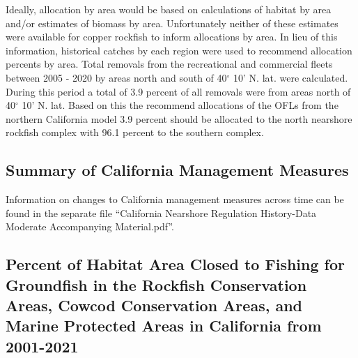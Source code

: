\documentclass[11pt,
  english,
  a4paper,
]{article}
\begin{document}
\leavevmode\tagmcend\tagstructend\par


Ideally, allocation by area would be based on calculations of habitat by area and/or estimates of biomass by area. Unfortunately neither of these estimates were available for copper rockfish to inform allocations by area. In lieu of this information, historical catches by each region were used to recommend allocation percents by area. Total removals from the recreational and commercial fleets between 2005 - 2020 by areas north and south of 40{\(^\circ\)\leavevmode\tagmcend\tagstructend} 10' N. lat. were calculated. During this period a total of 3.9 percent of all removals were from areas north of 40{\(^\circ\)\leavevmode\tagmcend\tagstructend} 10' N. lat. Based on this the recommend allocations of the OFLs from the northern California model 3.9 percent should be allocated to the north nearshore rockfish complex with 96.1 percent to the southern complex.

\leavevmode\tagmcend\tagstructend\par


\hypertarget{ca-man}{%
\subsection{Summary of California Management Measures}\label{ca-man}}

\leavevmode\tagmcend\tagstructend


Information on changes to California management measures across time can be found in the separate file ``California Nearshore Regulation History-Data Moderate Accompanying Material.pdf''.

\leavevmode\tagmcend\tagstructend\par


\hypertarget{percent-of-habitat-area-closed-to-fishing-for-groundfish-in-the-rockfish-conservation-areas-cowcod-conservation-areas-and-marine-protected-areas-in-california-from-2001-2021}{%
\subsection{Percent of Habitat Area Closed to Fishing for Groundfish in the Rockfish Conservation Areas, Cowcod Conservation Areas, and Marine Protected Areas in California from 2001-2021}\label{percent-of-habitat-area-closed-to-fishing-for-groundfish-in-the-rockfish-conservation-areas-cowcod-conservation-areas-and-marine-protected-areas-in-california-from-2001-2021}}
\end{document}
